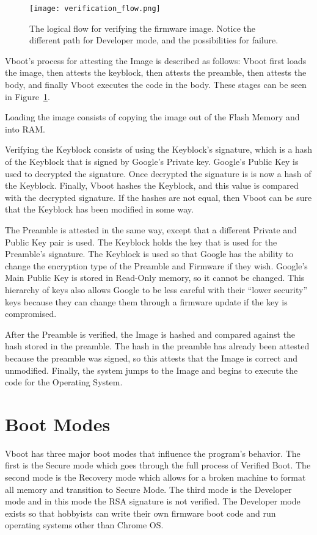 \begin{figure}
  \centering
  \texttt{[image: verification\_flow.png]}
  \caption[Verified Boot Program Flow]{The logical flow for verifying the firmware image. Notice
  the different path for Developer mode, and the possibilities for
  failure.}\label{fig:verif_flow}
\end{figure}

Vboot's process for attesting the Image is described as follows: Vboot first
loads the image, then attests the keyblock, then attests the
preamble, then attests the body, and finally Vboot executes the code in the body. 
These stages can be seen in Figure~\ref{fig:verif_flow}.

Loading the image consists of copying the image out of the Flash Memory and into
RAM\@.

Verifying the Keyblock consists of using the Keyblock's signature, which is a
hash of the Keyblock that is signed by Google's Private key.
Google's Public Key is used to decrypted the signature.
Once decrypted the signature is is now a hash of the Keyblock.
Finally, Vboot hashes the Keyblock, and this value is compared with the
decrypted signature.
If the hashes are not equal, then Vboot can be sure that the Keyblock has been
modified in some way. 

The Preamble is attested in the same way, except that a different Private and Public Key pair is used.
The Keyblock holds the key that is used for the Preamble's signature.
The Keyblock is used so that Google has the ability to change the encryption
type of the Preamble and Firmware if they wish.
Google's Main Public Key is stored in Read-Only memory, so it cannot be changed.
This hierarchy of keys also allows Google to be less careful with their ``lower
security'' keys because they can change them through a firmware update if the key is
compromised.

After the Preamble is verified, the Image is hashed and compared
against the hash stored in the preamble. 
The hash in the preamble has already been attested because the preamble was
signed, so this attests that the Image is correct and unmodified. Finally, the
system jumps to the Image and begins to execute the code for the 
Operating System.


\section{Boot Modes}\label{sec:boot-modes}

Vboot has three major boot modes that influence the program's behavior.
The first is the Secure mode which goes through the full process of Verified Boot.
The second mode is the Recovery mode which allows for a broken machine to
format all memory and transition to Secure Mode.
The third mode is the Developer mode and in this mode the RSA signature is not verified.
The Developer mode exists so that hobbyists can write their own firmware boot code and run operating systems other than Chrome OS\@.

